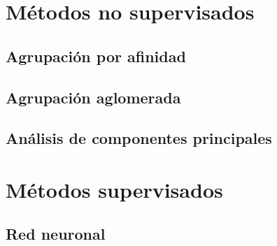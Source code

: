 \section{Métodos no supervisados}

\subsection{Agrupación por afinidad}

\subsection{Agrupación aglomerada}

\subsection{Análisis de componentes principales}

\newpage
\section{Métodos supervisados}

\subsection{Red neuronal}